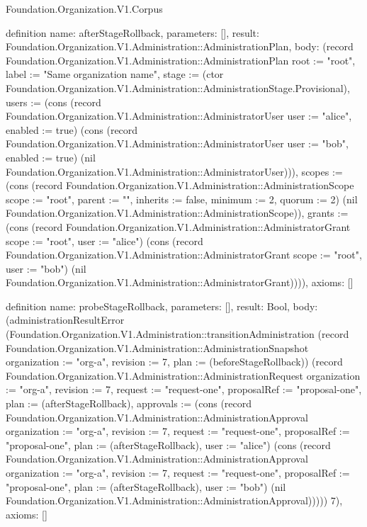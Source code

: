 \begin{lexlean}{Foundation.Organization.V1.Corpus}
\begin{semanticmodule}
definition{
  name: afterStageRollback,
  parameters: [],
  result: Foundation.Organization.V1.Administration::AdministrationPlan,
  body: (record Foundation.Organization.V1.Administration::AdministrationPlan {root := "root", label := "Same organization name", stage := (ctor Foundation.Organization.V1.Administration::AdministrationStage.Provisional), users := (cons (record Foundation.Organization.V1.Administration::AdministratorUser {user := "alice", enabled := true}) (cons (record Foundation.Organization.V1.Administration::AdministratorUser {user := "bob", enabled := true}) (nil Foundation.Organization.V1.Administration::AdministratorUser))), scopes := (cons (record Foundation.Organization.V1.Administration::AdministrationScope {scope := "root", parent := "", inherits := false, minimum := 2, quorum := 2}) (nil Foundation.Organization.V1.Administration::AdministrationScope)), grants := (cons (record Foundation.Organization.V1.Administration::AdministratorGrant {scope := "root", user := "alice"}) (cons (record Foundation.Organization.V1.Administration::AdministratorGrant {scope := "root", user := "bob"}) (nil Foundation.Organization.V1.Administration::AdministratorGrant)))}),
  axioms: []
}

definition{
  name: probeStageRollback,
  parameters: [],
  result: Bool,
  body: (administrationResultError (Foundation.Organization.V1.Administration::transitionAdministration (record Foundation.Organization.V1.Administration::AdministrationSnapshot {organization := "org-a", revision := 7, plan := (beforeStageRollback)}) (record Foundation.Organization.V1.Administration::AdministrationRequest {organization := "org-a", revision := 7, request := "request-one", proposalRef := "proposal-one", plan := (afterStageRollback), approvals := (cons (record Foundation.Organization.V1.Administration::AdministrationApproval {organization := "org-a", revision := 7, request := "request-one", proposalRef := "proposal-one", plan := (afterStageRollback), user := "alice"}) (cons (record Foundation.Organization.V1.Administration::AdministrationApproval {organization := "org-a", revision := 7, request := "request-one", proposalRef := "proposal-one", plan := (afterStageRollback), user := "bob"}) (nil Foundation.Organization.V1.Administration::AdministrationApproval)))})) 7),
  axioms: []
}


\end{semanticmodule}
\end{lexlean}
